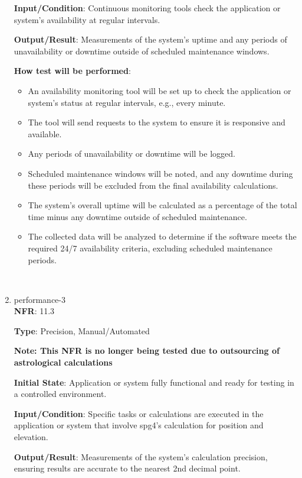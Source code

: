 \documentclass[12pt, titlepage]{article}
\begin{document}
\begin{enumerate}
\textbf{Input/Condition}: Continuous monitoring tools check the application or system's availability at regular intervals.

\textbf{Output/Result}: Measurements of the system's uptime and any periods of unavailability or downtime outside of scheduled maintenance windows.

\textbf{How test will be performed}: 
\begin{itemize}[noitemsep]
    \item An availability monitoring tool will be set up to check the application or system's status at regular intervals, e.g., every minute.
    \item The tool will send requests to the system to ensure it is responsive and available.
    \item Any periods of unavailability or downtime will be logged.
    \item Scheduled maintenance windows will be noted, and any downtime during these periods will be excluded from the final availability calculations.
    \item The system's overall uptime will be calculated as a percentage of the total time minus any downtime outside of scheduled maintenance.
    \item The collected data will be analyzed to determine if the software meets the required 24/7 availability criteria, excluding scheduled maintenance periods.
\end{itemize}\\

\item{performance-3 \\}
\textbf{NFR}: 11.3

\textbf{Type}: Precision, Manual/Automated

\textbf{Note: This NFR is no longer being tested due to outsourcing of astrological calculations    }

\textbf{Initial State}: Application or system fully functional and ready for testing in a controlled environment.

\textbf{Input/Condition}: Specific tasks or calculations are executed in the application or system that involve spg4's calculation for position and elevation.

\textbf{Output/Result}: Measurements of the system's calculation precision, ensuring results are accurate to the nearest 2nd decimal point.


\end{enumerate}
\end{document}
